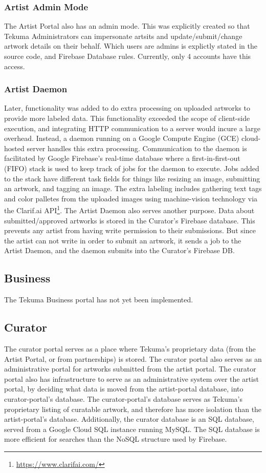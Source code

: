 \documentclass[fontsize=12pt]{scrartcl} %
\begin{document}
\subsubsection{Artist Admin Mode}
The Artist Portal also has an admin mode. This was explicitly created so that Tekuma Administrators can impersonate artsits and update/submit/change artwork details on their behalf. Which users are admins is explictly stated in the source code, and Firebase Database rules. Currently, only 4 accounts have this access.


\subsubsection{Artist Daemon}
Later, functionality was added to do extra processing on uploaded artworks to provide more labeled data. This functionality exceeded the scope of client-side execution, and integrating HTTP communication to a server would incure a large overhead. Instead, a daemon running on a Google Compute Engine (GCE) cloud-hosted server handles this extra processing. Communication to the daemon is facilitated by Google Firebase's real-time database where a first-in-first-out (FIFO) stack is used to keep track of jobs for the daemon to execute. Jobs added to the stack have different task fields for things like resizing an image, submitting an artwork, and tagging an image. The extra labeling includes gathering text tags and color palletes from the uploaded images using machine-vision technology via the Clarif.ai API\footnote{\url{https://www.clarifai.com/}}. The Artist Daemon also serves another purpose. Data about submitted/approved artworks is stored in the Curator's Firebase database. This prevents any artist from having write permission to their submissions. But since the artist can not write in order to submit an artwork, it sends a job to the Artist Daemon, and the daemon submits into the Curator's Firebase DB.

\subsection{Business}
The Tekuma Business portal has not yet been implemented.\\

\subsection{Curator}

The curator portal serves as a place where Tekuma's proprietary data (from the Artist Portal, or from partnerships) is stored. The curator portal also serves as an administrative portal for artworks submitted from the artist portal. The curator portal also has infrastructure to serve as an administrative system over the artist portal, by deciding what data is moved from the artist-portal database, into curator-portal's database.
The curator-portal's database serves as Tekuma's proprietary listing of curatable artwork, and therefore has more isolation than the artist-portal's database. Additionally, the curator database is an SQL database, served from a Google Cloud SQL instance running MySQL. The SQL database is more efficient for searches than the NoSQL structure used by Firebase.
\end{document}

